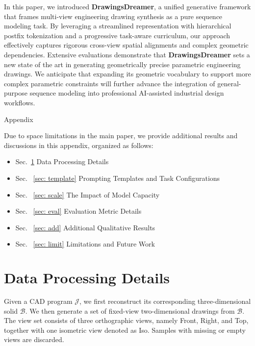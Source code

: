 \documentclass{article}
\begin{document}
In this paper, we introduced \textbf{DrawingsDreamer}, a unified generative framework that frames multi-view engineering drawing synthesis as a pure sequence modeling task. By leveraging a streamlined representation with hierarchical postfix tokenization and a progressive task-aware curriculum, our approach effectively captures rigorous cross-view spatial alignments and complex geometric dependencies. Extensive evaluations demonstrate that \textbf{DrawingsDreamer} sets a new state of the art in generating geometrically precise parametric engineering drawings. We anticipate that expanding its geometric vocabulary to support more complex parametric constraints will further advance the integration of general-purpose sequence modeling into professional AI-assisted industrial design workflows.





\appendix
\newpage
\appendix
\setcounter{figure}{0}
\renewcommand{\thefigure}{A\arabic{figure}}
{\huge{Appendix}}

Due to space limitations in the main paper, we provide additional results and discussions in this appendix, organized as follows:
\begin{itemize}
    \item Sec.~\ref{sec: dp} Data Processing Details

    \item Sec. ~\ref{sec: template} Prompting Templates and Task Configurations
    \item Sec. ~\ref{sec: scale} The Impact of Model Capacity
    \item Sec. ~\ref{sec: eval} Evaluation Metric Details

    \item Sec. ~\ref{sec: add} Additional Qualitative Results
    \item Sec. ~\ref{sec: limit} Limitations and Future Work
\end{itemize}


\section{Data Processing Details}
\label{sec: dp}
Given a CAD program $\mathcal{J}$, we first reconstruct its corresponding
three-dimensional solid $\mathcal{B}$. We then generate a set of fixed-view
two-dimensional drawings from $\mathcal{B}$. The view set consists of three
orthographic views, namely Front, Right, and Top, together with one isometric
view denoted as Iso. Samples with missing or empty views are discarded.
\end{document}

